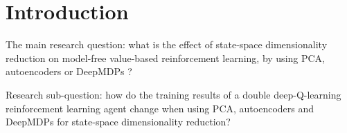 \chapter{Introduction}\label{introduction}

The main research question: what is the effect of state-space dimensionality reduction on model-free value-based reinforcement learning, by using PCA, autoencoders or DeepMDPs ? %

Research sub-question: how do the training results of a double deep-Q-learning reinforcement learning agent change when using PCA, autoencoders and DeepMDPs for state-space dimensionality reduction? 

%
